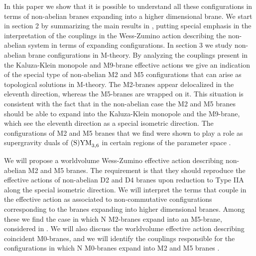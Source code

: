 \documentclass[12pt,a4paper]{article}
\begin{document}
In this paper we show that it is possible to understand all
these configurations in terms of non-abelian branes 
expanding into a higher dimensional brane. We start in section 2 by
summarizing the main results in \cite{Myers,CMT}, putting 
special emphasis in the interpretation of the couplings 
in the Wess-Zumino action describing the non-abelian system
in terms of expanding configurations.
In section 3 we study non-abelian
brane configurations in M-theory. By analyzing the couplings present
in the Kaluza-Klein monopole and M9-brane effective actions we give
an indication of the special type of
non-abelian M2 and M5 configurations that can arise as topological 
solutions in M-theory. The M2-branes appear delocalized in the 
eleventh direction, whereas the M5-branes are wrapped on it. 
This situation is consistent with the fact that in the non-abelian
case the M2 and M5 branes should be able to expand into the Kaluza-Klein
monopole and the M9-brane, which see the eleventh direction
as a special isometric direction. The configurations of M2 and M5
branes that we find were shown to
play a role as supergravity duals of ${\rm (S)YM}_{3,6}$ 
in certain regions
of the parameter space \cite{IMSY}.

We will propose a worldvolume Wess-Zumino effective action describing 
non-abelian M2 and M5 branes.
The requirement is that they should reproduce
the effective actions of non-abelian D2 and D4 branes upon
reduction to Type IIA along the special isometric direction. 
We will interpret the terms that couple in the effective action as
associated to non-commutative configurations corresponding to the
branes expanding into higher dimensional branes. Among these
we find the case in which N M2-branes expand into an
M5-brane, considered in \cite{Bena2}. We will also discuss the
worldvolume effective action describing coincident M0-branes, and
we will identify the couplings responsible for the configurations
in which N M0-branes expand
into M2 and M5 branes \cite{GST,GMT,DTV}. 
\end{document}
